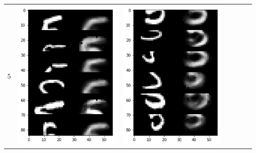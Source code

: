 \documentclass[12pt]{report} %
\begin{document}
\begin{tabular}{m{0.7cm}m{2.4cm}m{2.4cm}m{2.4cm}m{2.4cm}m{2.4cm}m{2.4cm}}
5 & \includegraphics[scale=0.3]{pictures/KE_5_up.png} & \includegraphics[scale=0.3]{pictures/KE_5_down.png} &

\end{tabular}
\end{document}
